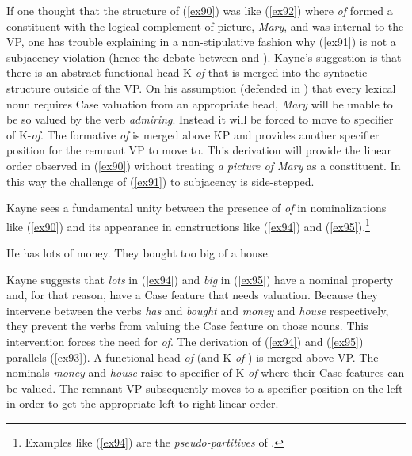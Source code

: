 \documentclass[output=paper,
modfonts
]{LSP/langsci}
\begin{document}
{{{If one thought that the structure of ({\ref{ex90}}) was like ({\ref{ex92}}) where {\textit{of}} formed a constituent with the logical complement of picture, {\textit{Mary}}, and was internal to the VP, one has trouble explaining in a non-stipulative fashion why ({\ref{ex91}}) is not a subjacency violation (hence the debate between {\citet{Bach76}} and {\citet{Chomsky77}}).  Kayne's suggestion is that there is an abstract functional head K-{\textit{of}} that is merged into the syntactic structure outside of the VP.  On his assumption (defended in {\citet{Emonds2000}}) that every lexical noun requires Case valuation from an appropriate head, {\textit{Mary}} will be unable to be so valued by the verb {\textit{admiring}}.  Instead it will be forced to move to specifier of K-{\textit{of}}.  The formative {\textit{of}}  is merged above KP and provides another specifier position for the remnant VP to move to.  This derivation will provide the linear order observed in ({\ref{ex90}}) without treating {\textit{a picture of Mary}} as a constituent.  In this way the challenge of ({\ref{ex91}}) to subjacency is side-stepped.

Kayne sees a fundamental unity between the presence of {\textit{of}} in nominalizations like ({\ref{ex90}}) and its appearance in constructions like ({\ref{ex94}}) and ({\ref{ex95}}).{\footnote{Examples like ({\ref{ex94}}) are the {\textit{pseudo-partitives}} of {\citet{Selkirk77}}.}}

\begin{exe}
\ex\label{ex94}  He has lots of money.
\ex\label{ex95}  They bought too big of a house.
\end{exe}
Kayne suggests that {\textit{lots}} in ({\ref{ex94}}) and {\textit{big}} in ({\ref{ex95}}) have a nominal property and, for that reason, have a Case feature that needs valuation.   Because they intervene between the verbs {\textit{has}} and {\textit{bought}} and {\textit{money}} and {\textit{house}} respectively, they prevent the verbs from valuing the Case feature on those nouns.  This intervention forces the need for {\textit{of}}.  The derivation of ({\ref{ex94}}) and ({\ref{ex95}}) parallels ({\ref{ex93}}).  A functional head {\textit{of}} (and K-{\textit{of}} ) is merged above VP.  The nominals {\textit{money}} and {\textit{house}} raise to specifier of K-{\textit{of}} where their Case features can be valued.  The  remnant VP subsequently moves to a specifier position on the left in order to get the appropriate left to right linear order.

}}}
\end{document}
